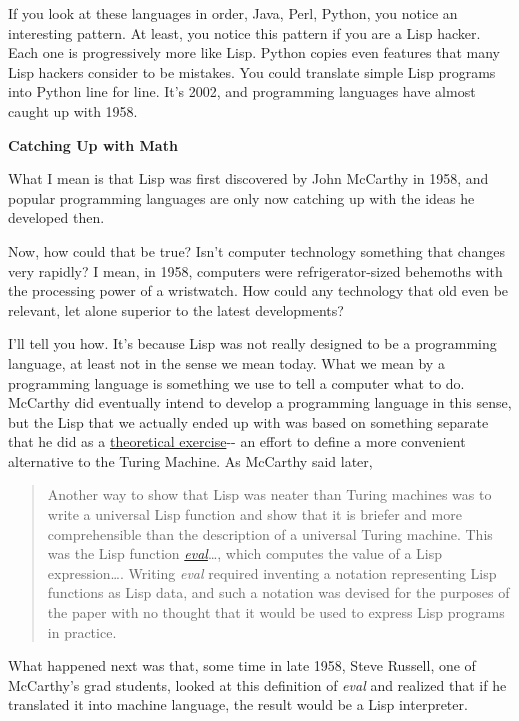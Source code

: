 If you look at these languages in order, Java, Perl, Python, you notice
an interesting pattern. At least, you notice this pattern if you are a
Lisp hacker. Each one is progressively more like Lisp. Python copies
even features that many Lisp hackers consider to be mistakes. You could
translate simple Lisp programs into Python line for line. It's 2002, and
programming languages have almost caught up with 1958.

\textbf{Catching Up with Math}

What I mean is that Lisp was first discovered by John McCarthy in 1958,
and popular programming languages are only now catching up with the
ideas he developed then.

Now, how could that be true? Isn't computer technology something that
changes very rapidly? I mean, in 1958, computers were refrigerator-sized
behemoths with the processing power of a wristwatch. How could any
technology that old even be relevant, let alone superior to the latest
developments?

I'll tell you how. It's because Lisp was not really designed to be a
programming language, at least not in the sense we mean today. What we
mean by a programming language is something we use to tell a computer
what to do. McCarthy did eventually intend to develop a programming
language in this sense, but the Lisp that we actually ended up with was
based on something separate that he did as a
\href{rootsoflisp.html}{theoretical exercise}-\/- an effort to define a
more convenient alternative to the Turing Machine. As McCarthy said
later,

\begin{quote}
Another way to show that Lisp was neater than Turing machines was to
write a universal Lisp function and show that it is briefer and more
comprehensible than the description of a universal Turing machine. This
was the Lisp function
\href{https://sep.turbifycdn.com/ty/cdn/paulgraham/jmc.lisp?t=1688221954&}{\emph{eval}}\ldots,
which computes the value of a Lisp expression\ldots. Writing \emph{eval}
required inventing a notation representing Lisp functions as Lisp data,
and such a notation was devised for the purposes of the paper with no
thought that it would be used to express Lisp programs in practice.
\end{quote}

What happened next was that, some time in late 1958, Steve Russell, one
of McCarthy's grad students, looked at this definition of \emph{eval}
and realized that if he translated it into machine language, the result
would be a Lisp interpreter.

